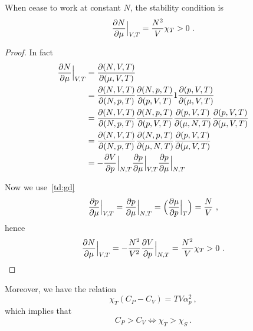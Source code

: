     When cease to work at constant $N$, the stability condition is 
    \begin{equation*}
        \frac{\partial N}{\partial\mu} \Big \vert_{V, T} = \frac{N^2}{V} \chi_T > 0 ~.
    \end{equation*}
    \begin{proof}
        In fact 
        \begin{equation*}
        \begin{aligned}
            \frac{\partial N}{\partial\mu} \Big \vert_{V, T} & = \frac{\partial(N, V, T)}{\partial(\mu, V, T)} \\ & = \frac{\partial(N, V, T)}{\partial(N, p, T)} \frac{\partial(N, p, T)}{\partial(p, V, T)} 1 \frac{\partial(p, V, T)}{\partial(\mu, V, T)} \\ & = \frac{\partial(N, V, T)}{\partial(N, p, T)} \frac{\partial(N, p, T)}{\partial(p, V, T)} \frac{\partial(p, V, T)}{\partial(\mu, N, T)} \frac{\partial(p, V, T)}{\partial(\mu, V, T)} \\ & = \frac{\partial(N, V, T)}{\partial(N, p, T)} \frac{\partial(N, p, T)}{\partial(\mu, N, T)} \frac{\partial(p, V, T)}{\partial(\mu, V, T)} \\ & = - \frac{\partial V}{\partial p} \Big \vert_{N, T}  \frac{\partial p}{\partial\mu} \Big \vert_{V, T}  \frac{\partial p}{\partial\mu} \Big \vert_{N, T} 
        \end{aligned}
        \end{equation*}

        Now we use~\eqref{td:gd}
        \begin{equation*}
            \frac{\partial p}{\partial\mu} \Big \vert_{V, T} = \frac{\partial p}{\partial\mu} \Big \vert_{N, T} = \Big ( \frac{\partial\mu}{\partial p} \Big \vert_T \Big) = \frac{N}{V} ~,
        \end{equation*}
        hence 
        \begin{equation*}
        \frac{\partial N}{\partial\mu} \Big \vert_{V, T} = - \frac{N^2}{V^2} \frac{\partial V}{\partial p} \Big \vert_{N,T} = \frac{N^2}{V} \chi_T > 0 ~.
        \end{equation*}
    \end{proof}

    Moreover, we have the relation 
    \begin{equation*}
        \chi_T (C_P - C_V) = T V \alpha_p^2 ~,
    \end{equation*}
    which implies that 
    \begin{equation*}
        C_P > C_V \iff \chi_T > \chi_S ~.
    \end{equation*}

